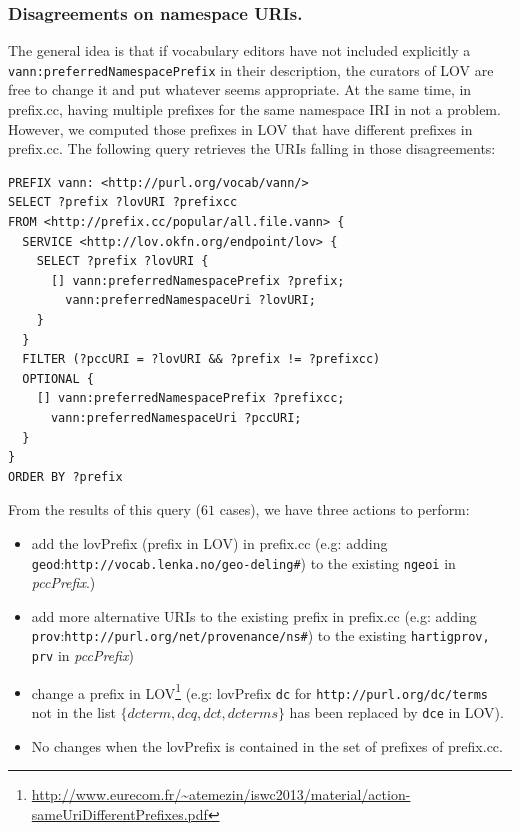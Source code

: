 \subsubsection*{Disagreements on namespace URIs.} The general idea is that if vocabulary editors have not included explicitly a \\ \texttt{vann:preferredNamespacePrefix} in their description, the curators of LOV are free to change it and put whatever seems appropriate. At the same time, in prefix.cc, having multiple prefixes for the same namespace IRI in not a problem. However, we computed those prefixes in LOV that have different prefixes in prefix.cc. The following query retrieves the URIs falling in those disagreements:
\begin{verbatim}
PREFIX vann: <http://purl.org/vocab/vann/>
SELECT ?prefix ?lovURI ?prefixcc
FROM <http://prefix.cc/popular/all.file.vann> {
  SERVICE <http://lov.okfn.org/endpoint/lov> {
    SELECT ?prefix ?lovURI {
      [] vann:preferredNamespacePrefix ?prefix;
        vann:preferredNamespaceUri ?lovURI;
    }
  }
  FILTER (?pccURI = ?lovURI && ?prefix != ?prefixcc)
  OPTIONAL {
    [] vann:preferredNamespacePrefix ?prefixcc;
      vann:preferredNamespaceUri ?pccURI;
  }
}
ORDER BY ?prefix
\end{verbatim}
From the results of this query ($61$ cases), we have three actions to perform:
\begin{itemize}
  \item add the lovPrefix (prefix in LOV) in prefix.cc (e.g: adding \\\texttt{geod}:\texttt{http://vocab.lenka.no/geo-deling\#}) to the existing \texttt{ngeoi} in \textit{pccPrefix}.)
  \item add more alternative URIs to the existing prefix in prefix.cc (e.g: adding \texttt{prov}:\texttt{http://purl.org/net/provenance/ns\#}) to the existing \texttt{hartigprov, prv} in \textit{pccPrefix})
  \item change a prefix in LOV\footnote{\url{http://www.eurecom.fr/~atemezin/iswc2013/material/action-sameUriDifferentPrefixes.pdf}} (e.g: lovPrefix \texttt{dc} for \texttt{http://purl.org/dc/terms} not in the list $\{dcterm, dcq, dct, dcterms\}$ has been replaced by \texttt{dce} in LOV).
  \item No changes when the lovPrefix is contained in the set of prefixes of prefix.cc.
\end{itemize}

